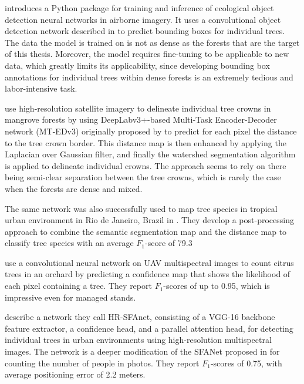 \citet{weinsteinDeepForestPythonPackage2020} introduces a Python package for training and inference of ecological object detection neural networks in airborne imagery.
It uses a convolutional object detection network described in \citet{weinsteinIndividualTreeCrownDetection2019} to predict bounding boxes for individual trees.
The data the model is trained on is not as dense as the forests that are the target of this thesis.
Moreover, the model requires fine-tuning to be applicable to new data, which greatly limits its applicability, since developing bounding box annotations for individual trees within dense forests is an extremely tedious and labor-intensive task.

\citet{lassalleDeepLearningbasedIndividual2022} use high-resolution satellite imagery to delineate individual tree crowns in mangrove forests by using DeepLabv3+-based Multi-Task Encoder-Decoder network (MT-EDv3) originally proposed by \citet{larosaMultitaskFullyConvolutional2021} to predict for each pixel the distance to the tree crown border.
This distance map is then enhanced by applying the Laplacian over Gaussian filter, and finally the watershed segmentation algorithm is applied to delineate individual crowns.
The approach seems to rely on there being semi-clear separation between the tree crowns, which is rarely the case when the forests are dense and mixed.

The same network was also successfully used to map tree species in tropical urban environment in Rio de Janeiro, Brazil in \citet{martinsDeepLearningbasedTree2021}.
They develop a post-processing approach to combine the semantic segmentation map and the distance map to classify tree species with an average $F_1$-score of 79.3%

\citet{oscoConvolutionalNeuralNetwork2020} use a convolutional neural network on UAV multispectral images to count citrus trees in an orchard by predicting a confidence map that shows the likelihood of each pixel containing a tree.
They report $F_1$-scores of up to 0.95, which is impressive even for managed stands.

\citet{venturaIndividualTreeDetection2024} describe a network they call HR-SFAnet, consisting of a VGG-16 \citep{simonyanVeryDeepConvolutional2014} backbone feature extractor, a confidence head, and a parallel attention head, for detecting individual trees in urban environments using high-resolution multispectral images.
The network is a deeper modification of the SFANet proposed in \citet{zhuDualPathMultiScale2019} for counting the number of people in photos.
They report $F_1$-scores of 0.75, with average positioning error of 2.2 meters.

